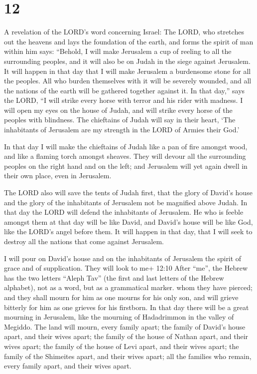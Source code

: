 \hypertarget{section-11}{%
\section{12}\label{section-11}}

 A revelation of the LORD's word concerning Israel: The
LORD, who stretches out the heavens and lays the foundation of the
earth, and forms the spirit of man within him says: 
``Behold, I will make Jerusalem a cup of reeling to all the surrounding
peoples, and it will also be on Judah in the siege against Jerusalem.
 It will happen in that day that I will make Jerusalem a
burdensome stone for all the peoples. All who burden themselves with it
will be severely wounded, and all the nations of the earth will be
gathered together against it.  In that day,'' says the LORD,
``I will strike every horse with terror and his rider with madness. I
will open my eyes on the house of Judah, and will strike every horse of
the peoples with blindness.  The chieftains of Judah will
say in their heart, `The inhabitants of Jerusalem are my strength in the
LORD of Armies their God.'

 In that day I will make the chieftains of Judah like a pan
of fire amongst wood, and like a flaming torch amongst sheaves. They
will devour all the surrounding peoples on the right hand and on the
left; and Jerusalem will yet again dwell in their own place, even in
Jerusalem.

 The LORD also will save the tents of Judah first, that the
glory of David's house and the glory of the inhabitants of Jerusalem not
be magnified above Judah.  In that day the LORD will defend
the inhabitants of Jerusalem. He who is feeble amongst them at that day
will be like David, and David's house will be like God, like the LORD's
angel before them.  It will happen in that day, that I will
seek to destroy all the nations that come against Jerusalem.

 I will pour on David's house and on the inhabitants of
Jerusalem the spirit of grace and of supplication. They will look to me+
12:10 After ``me'', the Hebrew has the two letters ``Aleph Tav'' (the
first and last letters of the Hebrew alphabet), not as a word, but as a
grammatical marker. whom they have pierced; and they shall mourn for him
as one mourns for his only son, and will grieve bitterly for him as one
grieves for his firstborn.  In that day there will be a
great mourning in Jerusalem, like the mourning of Hadadrimmon in the
valley of Megiddo.  The land will mourn, every family
apart; the family of David's house apart, and their wives apart; the
family of the house of Nathan apart, and their wives apart;
 the family of the house of Levi apart, and their wives
apart; the family of the Shimeites apart, and their wives apart;
 all the families who remain, every family apart, and their
wives apart.

